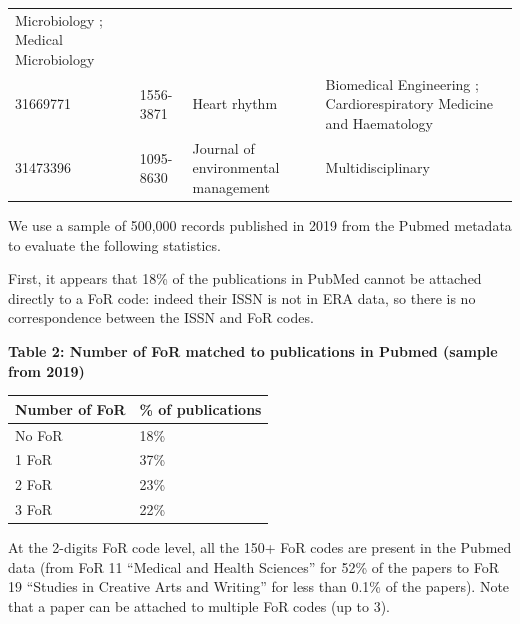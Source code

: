 \documentclass[
]{article}
\begin{document}
\begin{longtable}[]{@{}llll@{}}
\begin{minipage}[t]{0.22\columnwidth}
Microbiology ; Medical Microbiology\strut
\end{minipage}\tabularnewline
\begin{minipage}[t]{0.22\columnwidth}\raggedright
31669771\strut
\end{minipage} & \begin{minipage}[t]{0.22\columnwidth}\raggedright
1556-3871\strut
\end{minipage} & \begin{minipage}[t]{0.22\columnwidth}\raggedright
Heart rhythm\strut
\end{minipage} & \begin{minipage}[t]{0.22\columnwidth}\raggedright
Biomedical Engineering ; Cardiorespiratory Medicine and
Haematology\strut
\end{minipage}\tabularnewline
\begin{minipage}[t]{0.22\columnwidth}\raggedright
31473396\strut
\end{minipage} & \begin{minipage}[t]{0.22\columnwidth}\raggedright
1095-8630\strut
\end{minipage} & \begin{minipage}[t]{0.22\columnwidth}\raggedright
Journal of environmental management\strut
\end{minipage} & \begin{minipage}[t]{0.22\columnwidth}\raggedright
Multidisciplinary\strut
\end{minipage}\tabularnewline
\bottomrule
\end{longtable}

We use a sample of 500,000 records published in 2019 from the Pubmed
metadata to evaluate the following statistics.

First, it appears that 18\% of the publications in PubMed cannot be
attached directly to a FoR code: indeed their ISSN is not in ERA data,
so there is no correspondence between the ISSN and FoR codes.

\textbf{Table 2: Number of FoR matched to publications in Pubmed (sample
from 2019)}

\begin{longtable}[]{@{}ll@{}}
\toprule
Number of FoR & \% of publications\tabularnewline
\midrule
\endhead
No FoR & 18\%\tabularnewline
1 FoR & 37\%\tabularnewline
2 FoR & 23\%\tabularnewline
3 FoR & 22\%\tabularnewline
\bottomrule
\end{longtable}

At the 2-digits FoR code level, all the 150+ FoR codes are present in
the Pubmed data (from FoR 11 ``Medical and Health Sciences'' for 52\% of
the papers to FoR 19 ``Studies in Creative Arts and Writing'' for less
than 0.1\% of the papers). Note that a paper can be attached to multiple
FoR codes (up to 3).
\end{document}
